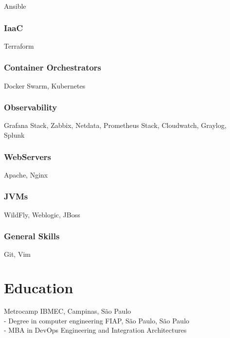 \documentclass{article}
\begin{document}
Ansible

\subsubsection{IaaC}

Terraform

\subsubsection{Container Orchestrators}

Docker Swarm, Kubernetes

\subsubsection{Observability}

Grafana Stack, Zabbix, Netdata, Prometheus Stack, Cloudwatch, Graylog, Splunk

\subsubsection{WebServers}

Apache, Nginx

\subsubsection{JVMs}

WildFly, Weblogic, JBoss

\subsubsection{General Skills}

Git, Vim

\section{Education}

Metrocamp IBMEC, Campinas, São Paulo \\
- Degree in computer engineering \newline
\newline
FIAP, São Paulo, São Paulo \\
- MBA in DevOps Engineering and Integration Architectures
\end{document}
